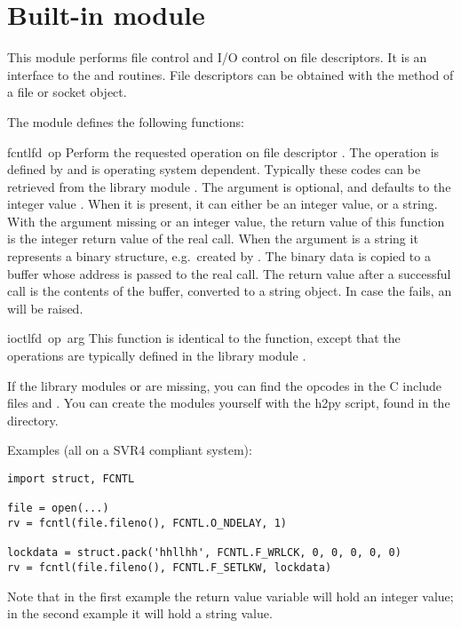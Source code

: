 \section{Built-in module }

This module performs file control and I/O control on file descriptors.
It is an interface to the  and  \UNIX{} routines.
File descriptors can be obtained with the  method of a
file or socket object.

The module defines the following functions:

\renewcommand{\indexsubitem}{(in module struct)}

\begin{funcdesc}{fcntl}{fd\, op}
  Perform the requested operation on file descriptor .
  The operation is defined by  and is operating system
  dependent.  Typically these codes can be retrieved from the library
  module . The argument  is optional, and
  defaults to the integer value .  When
  it is present, it can either be an integer value, or a string.  With
  the argument missing or an integer value, the return value of this
  function is the integer return value of the real 
  call.  When the argument is a string it represents a binary
  structure, e.g.\ created by . The binary data is
  copied to a buffer whose address is passed to the real 
  call.  The return value after a successful call is the contents of
  the buffer, converted to a string object.  In case the
   fails, an  will be raised.
\end{funcdesc}

\begin{funcdesc}{ioctl}{fd\, op\, arg}
  This function is identical to the  function, except
  that the operations are typically defined in the library module
  .
\end{funcdesc}

If the library modules  or  are missing, you
can find the opcodes in the C include files  and
. You can create the modules yourself with the h2py
script, found in the  directory.

Examples (all on a SVR4 compliant system):

\bcode\begin{verbatim}
import struct, FCNTL

file = open(...)
rv = fcntl(file.fileno(), FCNTL.O_NDELAY, 1)

lockdata = struct.pack('hhllhh', FCNTL.F_WRLCK, 0, 0, 0, 0, 0)
rv = fcntl(file.fileno(), FCNTL.F_SETLKW, lockdata)
\end{verbatim}\ecode

Note that in the first example the return value variable  will
hold an integer value; in the second example it will hold a string
value.
